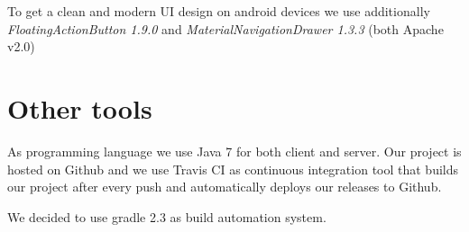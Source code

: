 \documentclass[ngerman, 11pt, a4paper]{scrartcl}
\begin{document}
To get a clean and modern UI design on android devices we use additionally \emph{FloatingActionButton 1.9.0} \cite{AFAB} and \emph{MaterialNavigationDrawer 1.3.3} \cite{MND} (both Apache v2.0)

\section{Other tools}
As programming language we use Java 7 for both client and server. Our project is hosted on Github \cite{github} and we use Travis CI \cite{Travis} as continuous integration tool that builds our project after every push and automatically deploys our releases to Github.

We decided to use gradle 2.3 \cite{gradle} as build automation system.\\

{\footnotesize
\begin{multicols}{2}
\renewcommand{\section}[2]{}%


\end{multicols}
}
\end{document}
